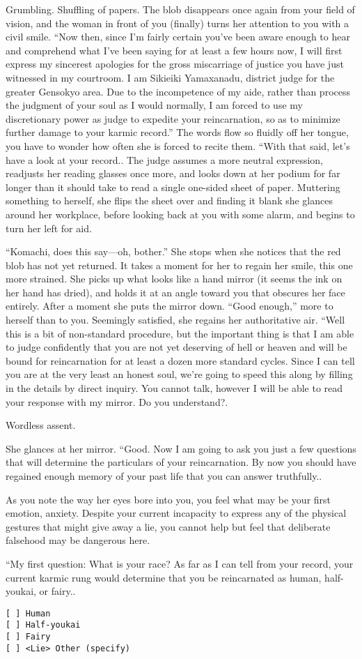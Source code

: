 \documentclass[a4paper,12pt]{book}
\begin{document}
Grumbling. Shuffling of papers. The blob disappears once again from your field of vision, and the woman in front of you (finally) turns her attention to you with a civil smile.
``Now then, since I’m fairly certain you’ve been aware enough to hear and comprehend what I’ve been saying for at least a few hours now, I will first express my sincerest apologies for the gross miscarriage of justice you have just witnessed in my courtroom. I am Sikieiki Yamaxanadu, district judge for the greater Gensokyo area. Due to the incompetence of my aide, rather than process the judgment of your soul as I would normally, I am forced to use my discretionary power as judge to expedite your reincarnation, so as to minimize further damage to your karmic record.'' The words flow so fluidly off her tongue, you have to wonder how often she is forced to recite them. ``With that said, let’s have a look at your record..
The judge assumes a more neutral expression, readjusts her reading glasses once more, and looks down at her podium for far longer than it should take to read a single one-sided sheet of paper. Muttering something to herself, she flips the sheet over and finding it blank she glances around her workplace, before looking back at you with some alarm, and begins to turn her left for aid.

``Komachi, does this say—oh, bother.'' She stops when she notices that the red blob has not yet returned. It takes a moment for her to regain her smile, this one more strained. She picks up what looks like a hand mirror (it seems the ink on her hand has dried), and holds it at an angle toward you that obscures her face entirely. After a moment she puts the mirror down. ``Good enough,'' more to herself than to you. Seemingly satisfied, she regains her authoritative air. ``Well this is a bit of non-standard procedure, but the important thing is that I am able to judge confidently that you are not yet deserving of hell or heaven and will be bound for reincarnation for at least a dozen more standard cycles. Since I can tell you are at the very least an honest soul, we’re going to speed this along by filling in the details by direct inquiry. You cannot talk, however I will be able to read your response with my mirror. Do you understand?.

Wordless assent.

She glances at her mirror. ``Good. Now I am going to ask you just a few questions that will determine the particulars of your reincarnation. By now you should have regained enough memory of your past life that you can answer truthfully..

As you note the way her eyes bore into you, you feel what may be your first emotion, anxiety. Despite your current incapacity to express any of the physical gestures that might give away a lie, you cannot help but feel that deliberate falsehood may be dangerous here.

``My first question: What is your race? As far as I can tell from your record, your current karmic rung would determine that you be reincarnated as human, half-youkai, or fairy..

\begin{verbatim}
[ ] Human 
[ ] Half-youkai 
[ ] Fairy 
[ ] <Lie> Other (specify) 
\end{verbatim}
\end{document}
